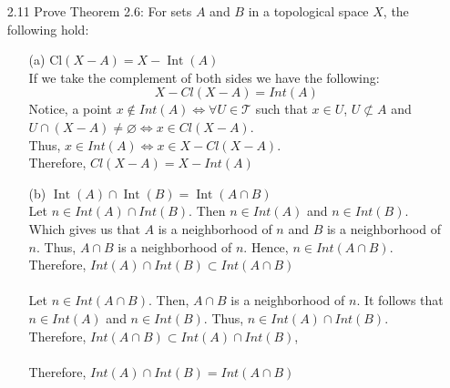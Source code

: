 \documentclass[12pt]{article}
\newcommand{\TT}{\mathcal{T}}
\begin{document}
\begin{enumerate}
		\item[2.11] Prove Theorem 2.6: For sets $ A $ and $ B $ in a topological space $ X $, the following hold:
		\begin{enumerate}
			\item[(a)] $\mathrm { Cl } ( X - A ) = X - \operatorname { Int } ( A )$\\
			If we take the complement of both sides we have the following:
			\[X-Cl(X-A)=Int(A)\]
			Notice, a point $x \not\in Int(A) \Leftrightarrow \forall U\in \TT $ such that $ x\in U $, $ U\not\subset A $ and $ U\cap (X-A)\not= \varnothing \Leftrightarrow x\in Cl(X-A)$.\\
			Thus, $ x \in Int(A) \Leftrightarrow x\in X-Cl(X-A) $.\\
			Therefore, $ Cl(X-A)=X-Int(A) $
			\item[(b)] $\operatorname { Int } ( A ) \cap \operatorname { Int } ( B ) = \operatorname { Int } ( A \cap B )$\\
			 Let $ n\in Int(A) \cap Int(B) $. Then $ n\in Int(A) $ and $ n\in Int(B) $. Which gives us that $ A $ is a neighborhood of $ n $ and $ B $ is a neighborhood of $ n $. Thus, $ A\cap B $ is a neighborhood of $ n $. Hence, $ n \in Int(A\cap B) $. \\
			Therefore, $ Int(A)\cap Int(B) \subset Int(A\cap B) $\\
			\\
			Let $ n \in Int(A\cap B) $. Then, $ A\cap B $ is a neighborhood of $ n $. It follows that $ n\in Int(A) $ and $ n\in Int(B) $. Thus, $ n\in Int(A) \cap Int(B) $.\\
			Therefore, $ Int(A\cap B) \subset Int(A) \cap Int(B) $,\\
			\\
			Therefore, $ Int(A)\cap Int(B) = Int(A\cap B) $\\
		\end{enumerate}
		
		
		

\end{enumerate}
\end{document}
